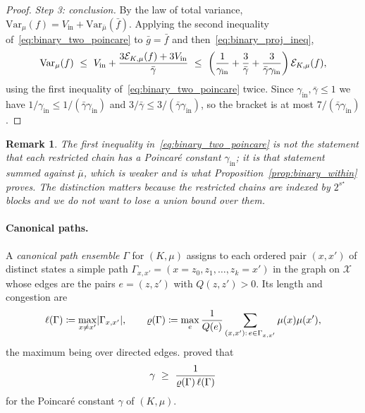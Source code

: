 \documentclass[aos]{imsart}%
\DeclarePairedDelimiter{\abs}{\lvert}{\rvert}
\newcommand{\ambientspace}[0]{\mathcal{X}}
\newcommand{\Var}{\mathrm{Var}}
\theoremstyle{plain}
\newtheorem{remark}{Remark}[section]
\theoremstyle{definition}
\begin{document}
\begin{proof}
        \emph{Step 3: conclusion.} By the law of total variance,
        $\Var_\mu(f)=V_{\mathrm{in}}+\Var_{\bar\mu}(\bar f)$. Applying the
        second inequality of~\eqref{eq:binary_two_poincare} to $\bar g=\bar f$
        and then~\eqref{eq:binary_proj_ineq},
        \begin{equation*}
            \Var_\mu(f)\ \leq\ V_{\mathrm{in}}
            +\frac{3\Dir_{K,\mu}(f)+3V_{\mathrm{in}}}{\bar\gamma}
            \ \leq\ \left(\frac{1}{\gamma_{\mathrm{in}}}
            +\frac{3}{\bar\gamma}
            +\frac{3}{\bar\gamma\gamma_{\mathrm{in}}}\right)\Dir_{K,\mu}(f),
        \end{equation*}
        using the first inequality of~\eqref{eq:binary_two_poincare} twice.
        Since $\gamma_{\mathrm{in}},\bar\gamma\leq1$ we have
        $1/\gamma_{\mathrm{in}}\leq1/(\bar\gamma\gamma_{\mathrm{in}})$ and
        $3/\bar\gamma\leq3/(\bar\gamma\gamma_{\mathrm{in}})$, so the bracket is
        at most $7/(\bar\gamma\gamma_{\mathrm{in}})$.
    \end{proof}

    \begin{remark}
        \label{rem:binary_decomposition}
        The first inequality in~\eqref{eq:binary_two_poincare} is not the
        statement that each restricted chain has a Poincar\'e constant
        $\gamma_{\mathrm{in}}$; it is that statement summed against
        $\bar\mu$, which is weaker and is what
        Proposition~\ref{prop:binary_within} proves. The distinction matters
        because the restricted chains are indexed by $2^{s^\star}$ blocks and
        we do not want to lose a union bound over them.
    \end{remark}

    \paragraph{Canonical paths.}
    A \emph{canonical path ensemble} $\Gamma$ for $(K,\mu)$ assigns to each
    ordered pair $(x,x')$ of distinct states a simple path
    $\Gamma_{x,x'}=(x=z_0,z_1,\dots,z_k=x')$ in the graph on $\ambientspace$
    whose edges are the pairs $e=(z,z')$ with $Q(z,z')>0$. Its length and
    congestion are
    \begin{equation}
        \label{eq:binary_congestion}
        \Len(\Gamma)\coloneq\max_{x\neq x'}\abs{\Gamma_{x,x'}},
        \qquad
        \Cong(\Gamma)\coloneq\max_{e}\frac{1}{Q(e)}
        \sum_{(x,x'):\,e\in\Gamma_{x,x'}}\mu(x)\mu(x'),
    \end{equation}
    the maximum being over directed edges. \citet{Sinclair1992} proved that
    \begin{equation}
        \label{eq:binary_sinclair}
        \gamma\ \geq\ \frac{1}{\varrho(\Gamma)\,\ell(\Gamma)}
    \end{equation}
    for the Poincar\'e constant $\gamma$ of $(K,\mu)$.
\end{document}
